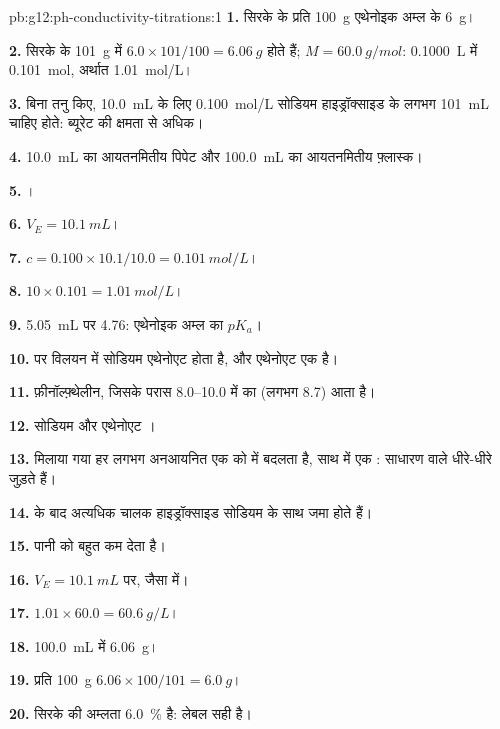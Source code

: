 \begin{solution}{pb:g12:ph-conductivity-titrations:1}
\textbf{1.} सिरके के प्रति \qty{100}{g} एथेनोइक अम्ल के \qty{6}{g}।

\textbf{2.} सिरके के \qty{101}{g} में $6.0 \times 101/100 =
\qty{6.06}{g}$ होते हैं; $M = \qty{60.0}{g/mol}$: \qty{0.1000}{L} में
\qty{0.101}{mol}, अर्थात \qty{1.01}{mol/L}।

\textbf{3.} बिना तनु किए, \qty{10.0}{mL} के लिए \qty{0.100}{mol/L} सोडियम हाइड्रॉक्साइड के
लगभग \qty{101}{mL} चाहिए होते: ब्यूरेट की क्षमता से अधिक।

\textbf{4.} \qty{10.0}{mL} का आयतनमितीय पिपेट और \qty{100.0}{mL} का
आयतनमितीय फ़्लास्क।

\textbf{5.} ।

\textbf{6.} $V_E = \qty{10.1}{mL}$।

\textbf{7.} $c = 0.100 \times 10.1 / 10.0 = \qty{0.101}{mol/L}$।

\textbf{8.} $10 \times 0.101 = \qty{1.01}{mol/L}$।

\textbf{9.} \qty{5.05}{mL} पर  4.76: एथेनोइक अम्ल का $pK_a$।

\textbf{10.}  पर विलयन में सोडियम एथेनोएट होता है, और
एथेनोएट एक  है।

\textbf{11.} फ़ीनॉल्फ़्थेलीन, जिसके परास 8.0--10.0 में  का 
(लगभग 8.7) आता है।

\textbf{12.} सोडियम  और एथेनोएट ।

\textbf{13.} मिलाया गया हर  लगभग अनआयनित एक  को
 में बदलता है, साथ में एक : साधारण  वाले 
धीरे-धीरे जुड़ते हैं।

\textbf{14.}  के बाद अत्यधिक चालक हाइड्रॉक्साइड 
सोडियम  के साथ जमा होते हैं।

\textbf{15.}  पानी को बहुत कम  देता है।

\textbf{16.} $V_E = \qty{10.1}{mL}$ पर, जैसा  में।

\textbf{17.} $1.01 \times 60.0 = \qty{60.6}{g/L}$।

\textbf{18.} \qty{100.0}{mL} में \qty{6.06}{g}।

\textbf{19.} प्रति \qty{100}{g} $6.06 \times 100 / 101 = \qty{6.0}{g}$।

\textbf{20.} सिरके की अम्लता \qty{6.0}{\percent} है: लेबल
सही है।
\end{solution}
